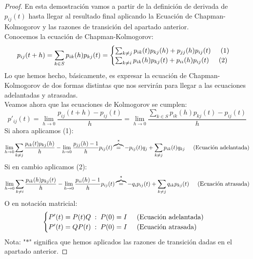 \documentclass[12pt,a4paper]{article}
\begin{document}
	\begin{proof}
		En esta demostración vamos a partir de la definición de derivada de $p_{ij}(t)$ hasta llegar al resultado final aplicando la Ecuación de Chapman-Kolmogorov y las razones de transición del apartado anterior.
		\\[0.2cm]
		Conocemos la ecuación de Chapman-Kolmogorov:
		\begin{equation*}
			p_{ij}(t+h) = \sum_{k \in S}p_{ik}(h)p_{kj}(t) = 
			\begin{cases}
				\sum_{k \neq j}p_{ik}(t)p_{kj}(h) + p_{jj}(h)p_{ij}(t) \hspace{0.5cm} (1)
				\\
				\sum_{k \neq i}p_{ik}(h)p_{kj}(t) + p_{ii}(h)p_{ij}(t) \hspace{0.5cm} (2)
			\end{cases}
		\end{equation*}
		Lo que hemos hecho, básicamente, es expresar la ecuación de Chapman-Kolmogorov de dos formas distintas que nos servirán para llegar a las ecuaciones adelantadas y atrasadas.
		\\[0.2cm]
		Veamos ahora que las ecuaciones de Kolmogorov se cumplen:
		\begin{equation*}
			p'_{ij}(t) = \lim_{h \rightarrow 0} \frac{p_{ij}(t+h) - p_{ij}(t)}{h} = \lim_{h \rightarrow 0} \frac{\sum_{k \in S}p_{ik}(h)p_{kj}(t) - p_{ij}(t)}{h}
		\end{equation*}
		Si ahora aplicamos (1):
		\begin{equation*}
			\lim_{h \rightarrow 0} \sum_{k \neq j}\frac{p_{ik}(t)p_{kj}(h)}{h} - \lim_{h \rightarrow 0}\frac{p_{jj}(h) - 1}{h}p_{ij}(t) \overbrace{=}^{*} -p_{ij}(t)q_{j} + \sum_{k \neq j} p_{ik}(t)q_{kj}\hspace{0.5cm} \text{(Ecuación adelantada)}
		\end{equation*}
		Si en cambio aplicamos (2):
		\begin{equation*}
			\lim_{h \rightarrow 0} \sum_{k \neq i}\frac{p_{ik}(h)p_{kj}(t)}{h} - \lim_{h \rightarrow 0}\frac{p_{ii}(h) - 1}{h}p_{ij}(t) \overbrace{=}^{*} -q_{i}p_{ij}(t) + \sum_{k \neq j} q_{ik}p_{kj}(t)\hspace{0.5cm} \text{(Ecuación atrasada)}
		\end{equation*}
		O en notación matricial:
		\begin{equation*}
			\begin{cases}
				P'(t) = P(t)Q\hspace{0.1cm}:\hspace{0.1cm}P(0) = I\hspace{0.5cm} \text{(Ecuación adelantada)} \\
				P'(t) = QP(t)\hspace{0.1cm}:\hspace{0.1cm}P(0) = I\hspace{0.5cm} \text{(Ecuación atrasada)}
			\end{cases}
		\end{equation*}
		Nota: "$*$" significa que hemos aplicados las razones de transición dadas en el apartado anterior.
	\end{proof}
\end{document}
